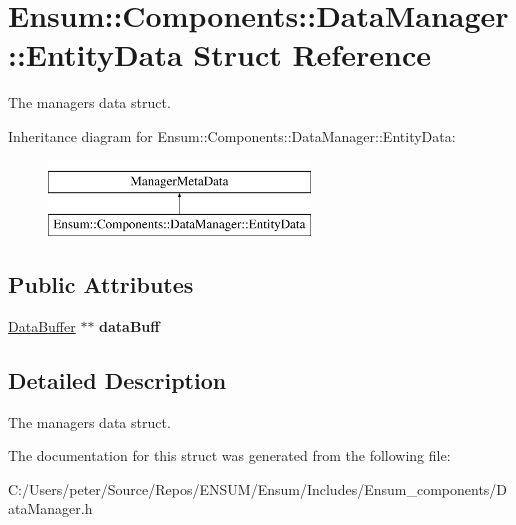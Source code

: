 \hypertarget{struct_ensum_1_1_components_1_1_data_manager_1_1_entity_data}{}\section{Ensum\+:\+:Components\+:\+:Data\+Manager\+:\+:Entity\+Data Struct Reference}
\label{struct_ensum_1_1_components_1_1_data_manager_1_1_entity_data}


The managers data struct.  


Inheritance diagram for Ensum\+:\+:Components\+:\+:Data\+Manager\+:\+:Entity\+Data\+:\begin{figure}[H]
\begin{center}
\leavevmode
\includegraphics[height=2.000000cm]{struct_ensum_1_1_components_1_1_data_manager_1_1_entity_data}
\end{center}
\end{figure}
\subsection*{Public Attributes}
\begin{DoxyCompactItemize}
\item 
\hyperlink{struct_ensum_1_1_components_1_1_data_manager_1_1_data_buffer}{Data\+Buffer} $\ast$$\ast$ {\bfseries data\+Buff}\hypertarget{struct_ensum_1_1_components_1_1_data_manager_1_1_entity_data_aaab508d0e5ef00b27e1ec6f58b397657}{}\label{struct_ensum_1_1_components_1_1_data_manager_1_1_entity_data_aaab508d0e5ef00b27e1ec6f58b397657}

\end{DoxyCompactItemize}


\subsection{Detailed Description}
The managers data struct. 

The documentation for this struct was generated from the following file\+:\begin{DoxyCompactItemize}
\item 
C\+:/\+Users/peter/\+Source/\+Repos/\+E\+N\+S\+U\+M/\+Ensum/\+Includes/\+Ensum\+\_\+components/Data\+Manager.\+h\end{DoxyCompactItemize}
